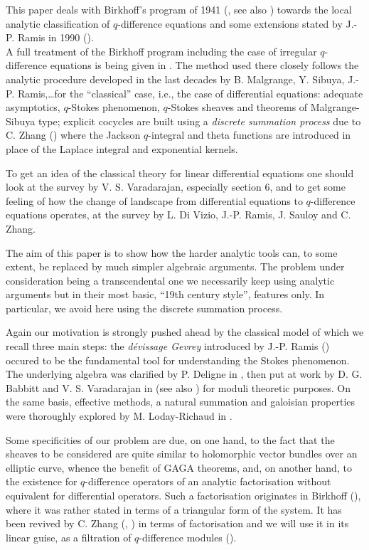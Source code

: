 \documentclass[english]{smfart}
\numberwithin{equation}{thm}
\begin{document}
This paper deals with Birkhoff's program of 1941
(\cite{Birkhoff3}, see also \cite{Birkhoff1}) towards the local 
analytic classification
of $q$-difference equations and some extensions stated by J.-P.
Ramis in 1990 (\cite{RamisJPRTraum}).
\\

A full treatment of the Birkhoff program including the case of
irregular $q$-difference equations is being given in \cite{RSZ}.
The method used there closely follows the analytic
procedure developed in the last decades by B. Malgrange, Y.
Sibuya, J.-P. Ramis,\dots for the ``classical'' case, i.e., the
case of differential equations: adequate asymptotics, $q$-Stokes
phenomenon, $q$-Stokes sheaves and theorems of Malgrange-Sibuya
type; explicit cocycles are built using a \emph{discrete summation
process} due to C. Zhang (\cite{Zha02}) where the Jackson
$q$-integral and theta functions are introduced in place of the
Laplace integral and exponential kernels.

To get an idea of the classical theory for linear differential
equations one should look at the survey \cite{Varadarajan} by V.
S. Varadarajan, especially section 6, and to get some feeling of
how the change of landscape from differential equations to
$q$-difference equations operates, at the survey \cite{DRSZ} by
L. Di Vizio, J.-P. Ramis, J. Sauloy and C. Zhang.
\bigskip

The aim of this paper is to show how the harder analytic tools
can, to some extent, be replaced by much simpler algebraic
arguments. The problem under consideration being a transcendental
one we necessarily keep using analytic arguments but in their
most basic,  ``19th century style'', features only. In
particular, we avoid here using the discrete summation process.

Again our motivation is strongly pushed ahead by the
classical model of which we recall three main steps: the
{\it d\'evissage Gevrey} introduced by J.-P. Ramis
(\cite{RamisGevrey}) occured to be the fundamental tool for
understanding the Stokes phenomenon. The underlying algebra was
clarified by P. Deligne in \cite{Deligne86}, then put at work by
D. G. Babbitt and V. S. Varadarajan in \cite{BV} (see also
\cite{Varadarajan}) for moduli theoretic purposes. On the same
basis, effective methods, a natural summation and galoisian
properties were thoroughly explored by M. Loday-Richaud in
\cite{MLR}.

Some  specificities of our problem are due, on
one hand, to the fact that the sheaves to be considered are
quite similar to holomorphic vector bundles over an elliptic
curve, whence the benefit of GAGA theorems, and, on another hand,
  to the existence for
$q$-difference operators of an analytic factorisation without
equivalent for differential operators. Such a factorisation
originates in Birkhoff (\cite{Birkhoff3}), where it was
rather stated in terms of a triangular form
of the system. It has been revived by C. Zhang
(\cite{Zha99}, \cite{MZ}) in terms of factorisation and we will
use it in its linear guise, as a filtration of $q$-difference
modules (\cite{JSFIL}). \\
\end{document}

